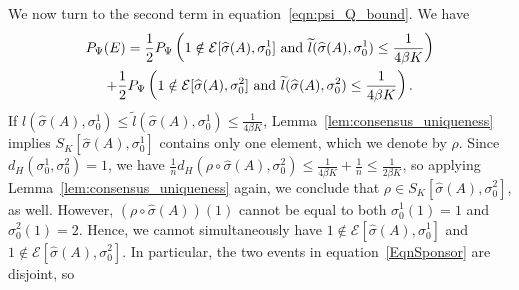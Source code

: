 \documentclass{article}
\begin{document}
We now turn to the second term in equation~\eqref{eqn:psi_Q_bound}. We have
\begin{multline}
\label{EqnSponsor}
P_\Psi(E) = \frac{1}{2} P_{\Psi}\left(1 \notin \mathcal{E}[\hat{\sigma}(A), \sigma_0^1] 
\trm{ and }\tilde{l}(\hat{\sigma}(A), \sigma_0^1)  \leq \frac{1}{4\beta K} \right) \\
%
+ \frac{1}{2} P_{\Psi}\left(1 \notin \mathcal{E}[\hat{\sigma}(A), \sigma_0^2]  
\trm{ and }\tilde{l}(\hat{\sigma}(A), \sigma_0^2)  \leq \frac{1}{4\beta K}  \right).
\end{multline}
If $l(\hat{\sigma}(A), \sigma_0^1) \leq \tilde{l}(\hat{\sigma}(A), \sigma_0^1) \leq \frac{1}{4 \beta K}$, Lemma~\ref{lem:consensus_uniqueness} implies $S_K[\hat{\sigma}(A), \sigma_0^1]$ contains only one element, which we denote by $\rho$. Since $d_H(\sigma_0^1, \sigma_0^2) = 1$, we have $\frac{1}{n} d_H(\rho \circ \hat{\sigma}(A), \sigma_0^2) \leq \frac{1}{4 \beta K} + \frac{1}{n} \leq \frac{1}{2 \beta K}$, so applying Lemma~\ref{lem:consensus_uniqueness} again, we conclude that $\rho \in S_K[\hat{\sigma}(A), \sigma_0^2]$, as well. However, $(\rho \circ \hat{\sigma}(A) )(1) $ cannot be equal to both $\sigma_0^1(1) = 1$ and $\sigma_0^2(1) = 2$. Hence, we cannot simultaneously have $1 \notin \mathcal{E}[\hat{\sigma}(A), \sigma_0^1]$ and $1 \notin \mathcal{E}[\hat{\sigma}(A), \sigma_0^2]$. In particular, the two events in equation~\eqref{EqnSponsor} are disjoint, so
\end{document}

